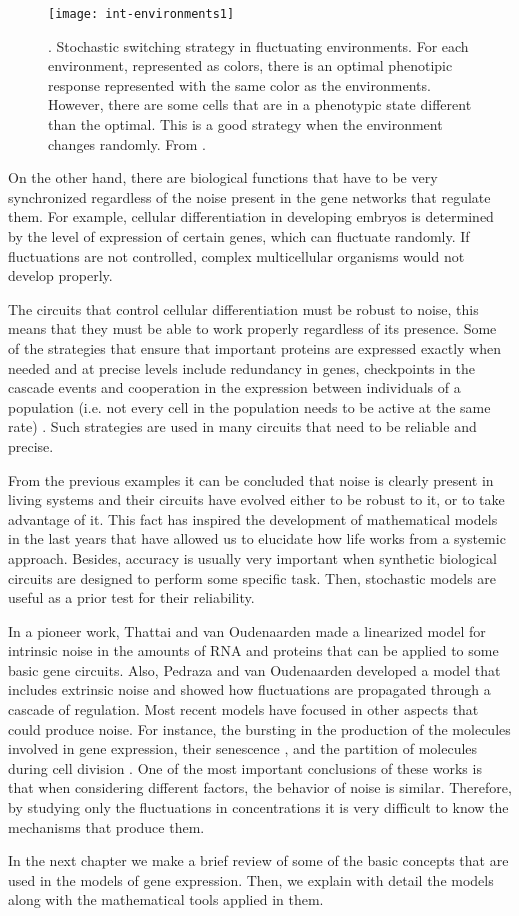 \begin{figure}[H]
  \centering
  \texttt{[image: int-environments1]}
  \caption[Stochastic switching strategy in fluctuating environments]{\label{fig:int-environments1}. Stochastic switching strategy in fluctuating environments. For each environment, represented as colors, there is an optimal phenotipic response represented with the same color as the environments. However, there are some cells that are in a phenotypic state different than the optimal. This is a good strategy when the environment changes randomly. From \cite{kussell05}.}
\end{figure}

On the other hand, there are biological functions that have to be very synchronized regardless of the noise present in the gene networks that regulate them. For example, cellular differentiation in developing embryos is determined by the level of expression of certain genes, which can fluctuate randomly. If fluctuations are not controlled, complex multicellular organisms would not develop properly.

The circuits that control cellular differentiation must be robust to noise, this means that they must be able to work properly regardless of its presence. Some of the strategies that ensure that important proteins are expressed exactly when needed and at precise levels include redundancy in genes, checkpoints in the cascade events and cooperation in the expression between individuals of a population (i.e. not every cell in the population needs to be active at the same rate) \cite{mcadams99}. Such strategies are used in many circuits that need to be reliable and precise.

From the previous examples it can be concluded that noise is clearly present in living systems and their circuits have evolved either to be robust to it, or to take advantage of it. This fact has inspired the development of mathematical models in the last years that have allowed us to elucidate how life works from a systemic approach. Besides, accuracy is usually very important when synthetic biological circuits are designed to perform some specific task. Then, stochastic models are useful as a prior test for their reliability.

In a pioneer work, Thattai and van Oudenaarden \cite{thattai01} made a linearized model for intrinsic noise in the amounts of RNA and proteins that can be applied to some basic gene circuits. Also, Pedraza and van Oudenaarden \cite{pedraza05} developed a model that includes extrinsic noise and showed how fluctuations are propagated through a cascade of regulation. Most recent models have focused in other aspects that could produce noise. For instance, the bursting in the production of the molecules involved in gene expression, their senescence \cite{pedraza08}, and the partition of molecules during cell division \cite{huh11a} \cite{huh11b}. One of the most important conclusions of these works is that when considering different factors, the behavior of noise is similar. Therefore, by studying only the fluctuations in concentrations it is very difficult to know the mechanisms that produce them.

In the next chapter we make a brief review of some of the basic concepts that are used in the models of gene expression. Then, we explain with detail the models along with the mathematical tools applied in them.

\renewcommand{\thefigure}{\arabic{chapter}.\arabic{section}.\arabic{figure}}
